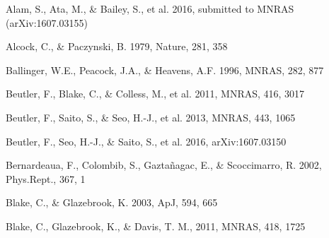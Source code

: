 \documentclass[iop]{emulateapj}
\begin{document}

\begin{thebibliography}{}


Alam, S., Ata, M., \& Bailey, S., et al. 2016,
submitted to MNRAS (arXiv:1607.03155)


Alcock, C., \& Paczynski, B. 1979, Nature, 281, 358  


  

Ballinger, W.E., Peacock, J.A., \& Heavens, A.F. 1996, MNRAS, 282, 877  



Beutler, F., Blake, C., \& Colless, M., et al. 2011, MNRAS, 416, 3017

Beutler, F., Saito, S., \& Seo, H.-J., et al. 2013, MNRAS, 443, 1065

Beutler, F., Seo, H.-J., \& Saito, S., et al. 2016,
arXiv:1607.03150

Bernardeaua, F., Colombib, S., Gaztañagac, E., \& Scoccimarro, R. 
2002, Phys.Rept., 367, 1

Blake, C., \& Glazebrook, K. 2003, ApJ, 594, 665


Blake, C., Glazebrook, K., \& Davis, T. M., 2011, MNRAS, 418, 1725  


\end{thebibliography}
\end{document}
